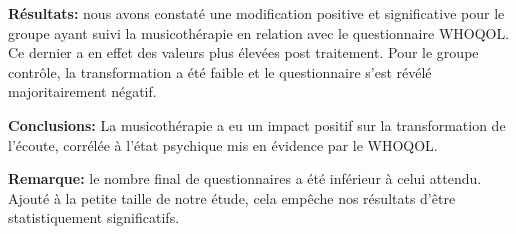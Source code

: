   
  \textbf{Résultats:} nous avons constaté une modification positive et significative pour le groupe ayant 
  suivi la 
  musicothérapie en relation avec le questionnaire WHOQOL. Ce dernier a en effet des valeurs plus 
  élevées 
  post traitement. 
  Pour le groupe contrôle, la transformation a été faible et le questionnaire s'est révélé majoritairement 
  négatif.
  
  
  \textbf{Conclusions:} La musicothérapie a eu un impact positif sur la transformation de l'écoute, 
  corrélée 
  à l'état psychique mis en évidence par le WHOQOL.
  
  
  \textbf{Remarque:} le nombre final de questionnaires a été 
  inférieur à celui attendu. Ajouté à la petite taille de notre étude, cela empêche nos résultats d'être 
  statistiquement significatifs.






